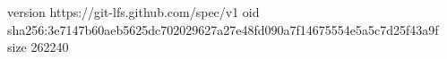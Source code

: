 version https://git-lfs.github.com/spec/v1
oid sha256:3e7147b60aeb5625dc702029627a27e48fd090a7f14675554e5a5c7d25f43a9f
size 262240
